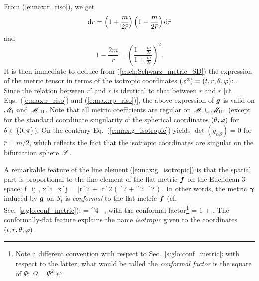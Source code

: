 From (\ref{e:max:r_riso}), we get
\[
    \mathrm{d} r = \left( 1 + \frac{m}{2\bar{r}} \right) \left( 1 - \frac{m}{2\bar{r}} \right)
        \mathrm{d} \bar{r}
\]
and
\[
    1 - \frac{2m}{r} = \left(
        \frac{ 1 - \frac{m}{2\bar{r}}}{1 + \frac{m}{2\bar{r}}} \right) ^2 .
\]
It is then immediate to deduce from (\ref{e:sch:Schwarz_metric_SD})
the expression of the metric tensor in
terms of the isotropic coordinates $(x^\alpha) = (t,\bar{r},\theta,\varphi)$:
\be \label{e:max:g_isotropic}
    .
\ee
Since the relation between $r'$ and $\bar{r}$ is identical to that between
$r$ and $\bar{r}$ [cf. Eqs.~(\ref{e:max:r_riso}) and (\ref{e:max:rp_riso})],
the above expression of $\bm{g}$ is valid on $\mathscr{M}_{\rm I}$ and $\mathscr{M}_{\rm III}$.
Note that all metric coefficients are regular on $\mathscr{M}_{\rm I}\cup\mathscr{M}_{\rm III}$
(except for the standard coordinate singularity of the spherical coordinates
$(\theta,\varphi)$ for $\theta\in\{0,\pi\}$). On the contrary Eq.~(\ref{e:max:g_isotropic})
yields $\det(g_{\alpha\beta}) = 0$ for $\bar{r}=m/2$, which reflects the fact that
the isotropic coordinates are singular on the bifurcation sphere $\mathscr{S}$.

A remarkable feature of the line element (\ref{e:max:g_isotropic}) is
that the spatial part is proportional to
the line element of the flat metric $\bm{f}$ on the Euclidean 3-space:
\be
    f_{ij} , \D x^i \, \D x^j = \D \bar{r}^2 + \bar{r}^2 \left( \D\th^2 + \sin^2\th\, \D\ph^2 \right) .
\ee
In other words, the metric $\bm{\gamma}$ induced by $\bm{g}$ on $\mathcal{S}_t$
is \emph{conformal} to the flat metric $\bm{f}$
(cf. Sec.~\ref{s:glo:conf_metric}):
\be
    \w{\gamma} = \Psi^4 \,  ,
\ee
with the conformal factor\footnote{Note a different convention with respect
to Sec.~\ref{s:glo:conf_metric}: with respect to the latter, what would be
called the \emph{conformal factor} is the square of $\Psi$: $\Omega = \Psi^2$.}
\be
    \Psi = 1 +  .
\ee
The conformally-flat feature explains the name \emph{isotropic} given to the
coordinates $(t,\bar{r},\theta,\varphi)$.


